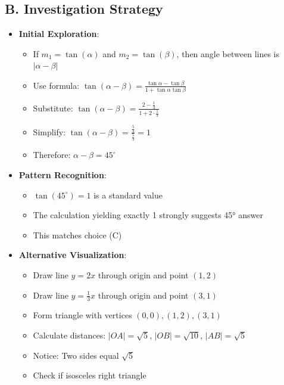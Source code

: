 \documentclass[12pt]{article}
\begin{document}
\begin{strategicbox}
\subsection*{B. Investigation Strategy}
\begin{itemize}[leftmargin=*]
    \item \textbf{Initial Exploration}: 
    \begin{itemize}
        \item If $m_1 = \tan(\alpha)$ and $m_2 = \tan(\beta)$, then angle between lines is $|\alpha - \beta|$
        \item Use formula: $\tan(\alpha - \beta) = \frac{\tan\alpha - \tan\beta}{1 + \tan\alpha \tan\beta}$
        \item Substitute: $\tan(\alpha - \beta) = \frac{2 - \frac{1}{3}}{1 + 2 \cdot \frac{1}{3}}$
        \item Simplify: $\tan(\alpha - \beta) = \frac{\frac{5}{3}}{\frac{5}{3}} = 1$
        \item Therefore: $\alpha - \beta = 45^\circ$
    \end{itemize}
    \item \textbf{Pattern Recognition}: 
    \begin{itemize}
        \item $\tan(45^\circ) = 1$ is a standard value
        \item The calculation yielding exactly 1 strongly suggests 45° answer
        \item This matches choice (C)
    \end{itemize}
    \item \textbf{Alternative Visualization}: 
    \begin{itemize}
        \item Draw line $y = 2x$ through origin and point $(1, 2)$
        \item Draw line $y = \frac{1}{3}x$ through origin and point $(3, 1)$
        \item Form triangle with vertices $(0, 0), (1, 2), (3, 1)$
        \item Calculate distances: $|OA| = \sqrt{5}$, $|OB| = \sqrt{10}$, $|AB| = \sqrt{5}$
        \item Notice: Two sides equal $\sqrt{5}$
        \item Check if isosceles right triangle
    \end{itemize}
\end{itemize}


\end{strategicbox}
\end{document}
